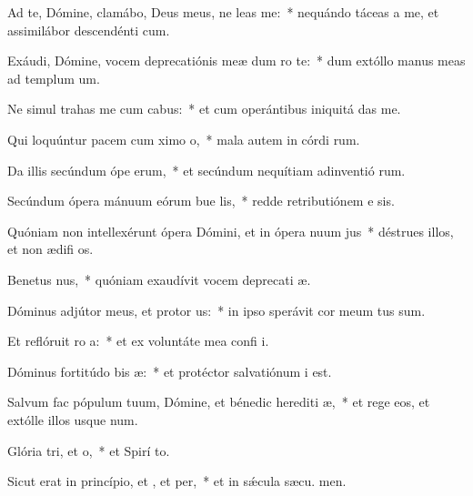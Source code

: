 \item Ad te, Dómine, clamábo, Deus meus, ne leas  me:~* nequándo táceas a me, et assimilábor descendénti  cum.
\item Exáudi, Dómine, vocem deprecatiónis meæ dum ro  te:~* dum extóllo manus meas ad templum  um.
\item Ne simul trahas me cum cabus:~* et cum operántibus iniquitá  das me.
\item Qui loquúntur pacem cum ximo o,~* mala autem in córdi rum.
\item Da illis secúndum ópe erum,~* et secúndum nequítiam adinventió rum.
\item Secúndum ópera mánuum eórum bue lis,~* redde retributiónem e sis.
\item Quóniam non intellexérunt ópera Dómini, et in ópera nuum jus~* déstrues illos, et non ædifi os.
\item Benetus nus,~* quóniam exaudívit vocem deprecati æ.
\item Dóminus adjútor meus, et protor us:~* in ipso sperávit cor meum  tus sum.
\item Et reflóruit ro a:~* et ex voluntáte mea confi i.
\item Dóminus fortitúdo bis æ:~* et protéctor salvatiónum  i est.
\item Salvum fac pópulum tuum, Dómine, et bénedic herediti æ,~* et rege eos, et extólle illos usque  num.
\item Glória tri, et o,~* et Spirí to.
\item Sicut erat in princípio, et , et per,~* et in sǽcula sæcu. men.
